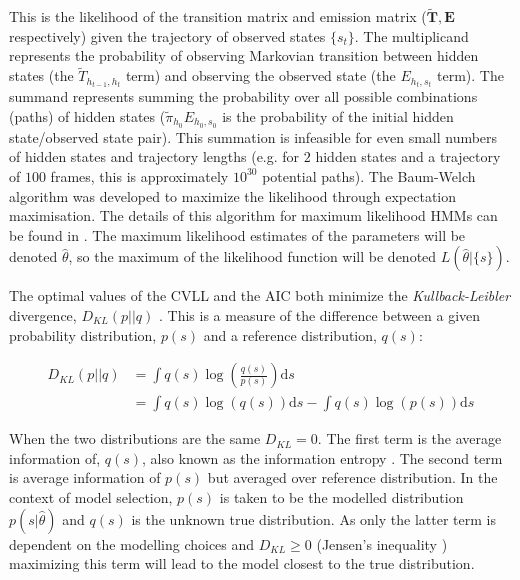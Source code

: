 This is the likelihood of the transition matrix and emission matrix ($\tilde{\mathbf{T}}, \mathbf{E}$ respectively) given the trajectory of observed states $\{s_t\}$. The multiplicand represents the probability of observing Markovian transition between hidden states (the $\tilde{T}_{h_{t-1}, h_{t}}$ term) and  observing the observed state (the $E_{h_t, s_t}$ term). The summand represents summing the probability over all possible combinations (paths) of hidden states ($\tilde{\pi}_{h_{0}}E_{ h_{0}, s_{0}}$ is the probability of the initial hidden state/observed state pair). This summation is infeasible for even small numbers of hidden states and trajectory lengths (e.g. for $2$ hidden states and a trajectory of $100$ frames, this is approximately $10^{30}$ potential paths). The Baum-Welch algorithm \cite{rabinerTutorialHiddenMarkov1989} was developed to maximize the likelihood through expectation maximisation. The details of this algorithm for maximum likelihood HMMs can be found in \cite{noeProjectedHiddenMarkov2013a}.  The maximum likelihood estimates of the parameters will be denoted $\hat{\theta}$, so the maximum of the likelihood function will be denoted $L(\hat{\theta}|\{s\})$. 

The optimal values of the CVLL and the AIC both minimize the \emph{Kullback-Leibler} divergence, $D_{KL}(p||q)$ \cite{mclachlanFiniteMixtureModels2000}. This is a measure of the difference between a given probability distribution, $p(s)$ and a reference distribution, $q(s)$: 

\begin{equation}\label{eqn:kl_div}
\begin{split}
    D_{KL}\left(p||q\right) & = \int q(s) \log{\left(\frac{ q(s) }{p(s)}  \right)} \mathrm{d}s \\ 
    & = \int q(s) \log{\left(q(s)\right)}\mathrm{d}s - \int q(s)\log{\left(p(s)\right)} \mathrm{d}s
\end{split}
\end{equation}

When the two distributions are the same $D_{KL} = 0$. The first term is the average information of, $q(s)$, also known as the information entropy \cite{mackay2003information}. The second term is average information of $p(s)$ but averaged over reference distribution. In the context of model selection, $p(s)$ is taken to be the modelled distribution $p(s|\hat{\theta})$ and $q(s)$ is the unknown true distribution. As only the latter term is dependent on the modelling choices and  $D_{KL}\ge 0$ (Jensen's inequality \cite{mackay2003information}) maximizing this term will lead to the model closest to the true distribution.  

